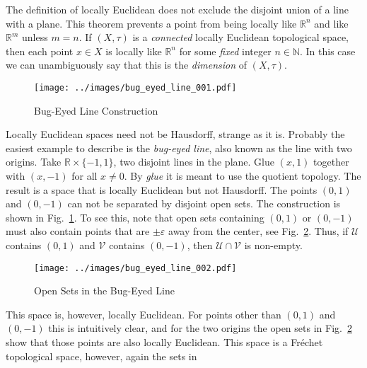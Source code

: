 \documentclass{article}
\theoremstyle{plain}
\theoremstyle{normal}
\begin{document}
        The definition of locally Euclidean does not exclude the disjoint
        union of a line with a plane. This theorem prevents a point from being
        locally like $\mathbb{R}^{n}$ and like $\mathbb{R}^{m}$ unless $m=n$.
        If $(X,\tau)$ is a \textit{connected} locally Euclidean topological
        space, then each point $x\in{X}$ is locally like $\mathbb{R}^{n}$ for
        some \textit{fixed} integer $n\in\mathbb{N}$. In this case we can
        unambiguously say that this is the \textit{dimension} of $(X,\tau)$.
        \par\hfill\par
        \begin{figure}
            \centering
            \texttt{[image: ../images/bug\_eyed\_line\_001.pdf]}
            \caption{Bug-Eyed Line Construction}
            \label{fig:bug_eyed_line_construction}
        \end{figure}
        Locally Euclidean spaces need not be Hausdorff, strange as it is.
        Probably the easiest example to describe is the \textit{bug-eyed line},
        also known as the line with two origins.
        Take $\mathbb{R}\times\{-1,1\}$, two disjoint lines in the plane.
        Glue $(x,1)$ together with $(x,-1)$ for all $x\ne{0}$. By \textit{glue}
        it is meant to use the quotient topology. The result is a space that
        is locally Euclidean but not Hausdorff. The points $(0,1)$ and $(0,-1)$
        can not be separated by disjoint open sets. The construction is shown
        in Fig.~\ref{fig:bug_eyed_line_construction}. To see this, note that
        open sets containing $(0,1)$ or $(0,-1)$ must also contain points that
        are $\pm\varepsilon$ away from the center, see
        Fig.~\ref{fig:bug_eyed_line_open_sets}. Thus, if $\mathcal{U}$
        contains $(0,1)$ and $\mathcal{V}$ contains $(0,-1)$, then
        $\mathcal{U}\cap\mathcal{V}$ is non-empty.
        \begin{figure}
            \centering
            \texttt{[image: ../images/bug\_eyed\_line\_002.pdf]}
            \caption{Open Sets in the Bug-Eyed Line}
            \label{fig:bug_eyed_line_open_sets}
        \end{figure}
        This space is, however, locally Euclidean. For points other than
        $(0,1)$ and $(0,-1)$ this is intuitively clear, and for the two origins
        the open sets in Fig.~\ref{fig:bug_eyed_line_open_sets} show that those
        points are also locally Euclidean. This space is a Fr\'{e}chet
        topological space, however, again the sets in
\end{document}
